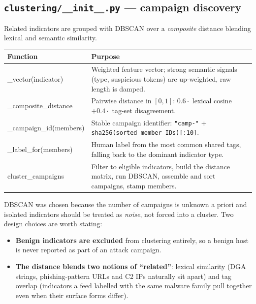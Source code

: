 \documentclass[11pt,a4paper]{article}
\newcommand{\code}[1]{\texttt{\small #1}}
\begin{document}
\subsection{\code{clustering/\_\_init\_\_.py} --- campaign discovery}
Related indicators are grouped with DBSCAN over a \emph{composite} distance
blending lexical and semantic similarity.

\begin{center}
\begin{tabularx}{\linewidth}{@{}>{\ttfamily\small}p{4.6cm}X@{}}
\toprule
\rowcolor{paper}\textbf{Function} & \textbf{Purpose} \\
\midrule
\_vector(indicator) & Weighted feature vector; strong semantic signals (type, suspicious tokens) are up-weighted, raw length is damped. \\
\_composite\_distance & Pairwise distance in $[0,1]$: $0.6\cdot$ lexical cosine $+ 0.4\cdot$ tag-set disagreement. \\
\_campaign\_id(members) & Stable campaign identifier: \code{"camp-"} + \code{sha256(sorted member IDs)[:10]}. \\
\_label\_for(members) & Human label from the most common shared tags, falling back to the dominant indicator type. \\
cluster\_campaigns & Filter to eligible indicators, build the distance matrix, run DBSCAN, assemble and sort campaigns, stamp members. \\
\bottomrule
\end{tabularx}
\end{center}

DBSCAN was chosen because the number of campaigns is unknown a priori and
isolated indicators should be treated as \emph{noise}, not forced into a cluster.
Two design choices are worth stating:

\begin{itemize}[leftmargin=1.4em,itemsep=2pt]
  \item \textbf{Benign indicators are excluded} from clustering entirely, so a
        benign host is never reported as part of an attack campaign.
  \item \textbf{The distance blends two notions of ``related''}: lexical
        similarity (DGA strings, phishing-pattern URLs and C2 IPs naturally sit
        apart) and tag overlap (indicators a feed labelled with the same
        malware family pull together even when their surface forms differ).
\end{itemize}
\end{document}
